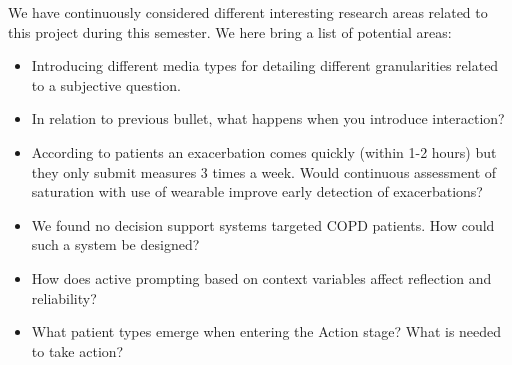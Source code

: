 We have continuously considered different interesting research areas related to this project during this semester. We here bring a list of potential areas:

\begin{itemize}
	\item Introducing different media types for detailing different granularities related to a subjective question.
	\item In relation to previous bullet, what happens when you introduce interaction? 
	\item According to patients an exacerbation comes quickly (within 1-2 hours) but they only submit measures 3 times a week. Would continuous assessment of saturation with use of wearable improve early detection of exacerbations?
	\item We found no decision support systems targeted COPD patients. How could such a system be designed?
	\item How does active prompting based on context variables affect reflection and reliability?
	\item What patient types emerge when entering the Action stage? What is needed to take action?
\end{itemize}  